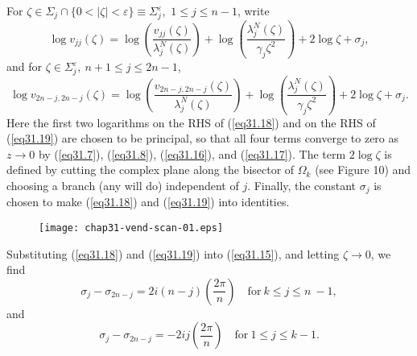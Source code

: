 \documentclass{surv-l}
\theoremstyle{plain}
\theoremstyle{definition}
\numberwithin{equation}{chapter}
\begin{document}
For $\zeta \in{\Sigma}_{j}\cap\{0<|\zeta|<\varepsilon \} \equiv{\Sigma}_{j}^{\varepsilon}$,\ $1\leq j\leq n-1$, write
\begin{equation}\label{eq31.18}
\log v_{jj}(\zeta)=\log\left(\frac{v_{jj}(\zeta)}{\lambda_{j}^{N}(\zeta)}\right)+\log\left(\frac{\lambda_{j}^{N}(\zeta)}{\gamma_{j}\zeta^{2}}\right)+2\log\zeta+\sigma_{j},
\end{equation}
and for $\zeta\in\Sigma_{j}^{\varepsilon},\ n +1\leq j\leq 2n-1$,
\begin{equation}\label{eq31.19}
\displaystyle \log v_{2n-j, 2n-j}(\zeta)=\log\left(\frac{v_{2n-j, 2n-j}(\zeta)}{\lambda_{j}^{N}(\zeta)}\right)+\log\left(\frac{\lambda_{j}^{N}(\zeta)}{\gamma_{j}\zeta^{2}}\right)+2\log\zeta+\sigma_{j}.
\end{equation}
Here the first two logarithms on the RHS of (\ref{eq31.18}) and on the RHS of (\ref{eq31.19}) are chosen to be principal, so that all four terms converge to zero as $z\rightarrow 0$ by (\ref{eq31.7}), (\ref{eq31.8}), (\ref{eq31.16}), and (\ref{eq31.17}). The term $ 2\log\zeta$ is defined by cutting the complex plane along the bisector of $\Omega_{k}$ (see Figure 10) and choosing a branch (any will do) independent of $j$. Finally, the constant $\sigma_{j}$ is chosen to make (\ref{eq31.18}) and (\ref{eq31.19}) into identities.

\begin{figure}
\texttt{[image: chap31-vend-scan-01.eps]}
\caption{ }
\end{figure}

Substituting (\ref{eq31.18}) and (\ref{eq31.19}) into (\ref{eq31.15}),   and letting $\zeta\rightarrow 0$, we find
\begin{equation}\label{eq31.20}
\sigma_{j}-\sigma_{2n-j}=2i(n-j)\left(\frac{2\pi}{n}\right)\quad \mathrm{for}\ k\leq j\leq n\ -1,
\end{equation}
and
\begin{equation}\label{eq31.21}
\sigma_{j}-\sigma_{2n-j}=-2ij\left(\frac{2\pi}{n}\right)\quad \mathrm{for}\ 1\leq j\leq k-1.
\end{equation}
\end{document}
